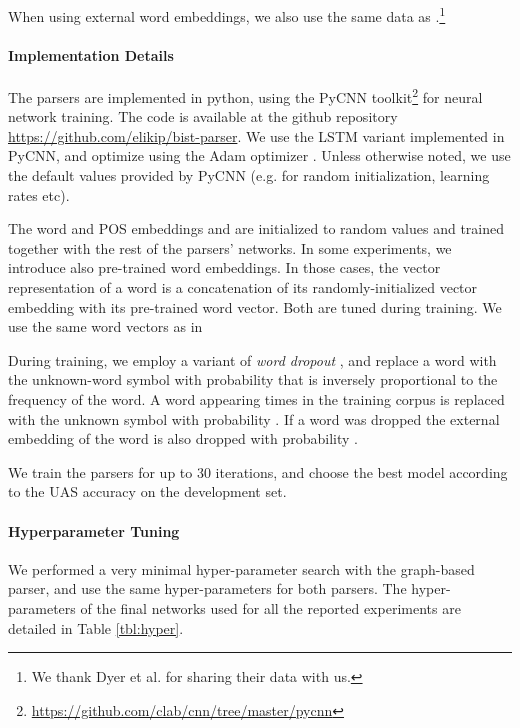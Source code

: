 \documentclass[11pt]{article}
\begin{document}
When using external word embeddings, we also use the same data as
.\footnote{We thank Dyer et al. for
sharing their data with us.}


\paragraph{Implementation Details}
The parsers are implemented in python, using the PyCNN
toolkit\footnote{\url{https://github.com/clab/cnn/tree/master/pycnn}} for neural network
training. The code is available at the github repository \url{https://github.com/elikip/bist-parser}.
We use the LSTM variant implemented in PyCNN, and optimize using the Adam
optimizer \cite{kingma2014adam}.  Unless otherwise noted, we use the default values provided
by PyCNN (e.g. for random initialization, learning rates etc). 


The word and POS embeddings  and  are initialized to random
values and trained together with the rest of the parsers' networks. 
In some experiments, we introduce also pre-trained word embeddings. In those
cases,
the vector representation of a word is a concatenation
of its randomly-initialized vector embedding with its pre-trained word vector.
Both are tuned during training.
We use the same word vectors as in 

During training, we employ a variant of \emph{word dropout}
\cite{iyyer2015deep}, and replace a word with the unknown-word symbol with probability
that is inversely proportional to the frequency of the word. A 
word  appearing  times in the training corpus is replaced with the unknown symbol
with probability  .
If a word was dropped the external embedding of the word is also dropped with probability .

We train the parsers for up to 30 iterations, and choose the best model
according to the UAS accuracy on the development set.

\paragraph{Hyperparameter Tuning}
We performed a very minimal hyper-parameter search with the graph-based parser,
and use the same hyper-parameters for both parsers.
The hyper-parameters of the final networks used for all the reported experiments
are detailed in Table \ref{tbl:hyper}.
\end{document}
